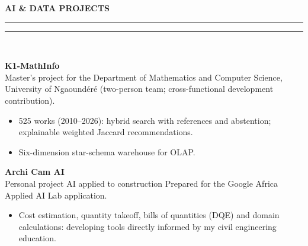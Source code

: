\documentclass[10pt,a4paper]{article}
\newcommand{\mainSecTitle}[1]{%
  \vspace{11pt}%
  {\fontsize{11.0}{13.0}\selectfont\textbf{\color{sectionNavy}\MakeUppercase{#1}}}\\[2.5pt]%
  {\color{accentTeal}\rule{19mm}{1.2pt}\color{subtleRule}\rule{\dimexpr\linewidth-19mm\relax}{0.6pt}}\\[6pt]%
}
\begin{document}
\begin{minipage}[t]{0.648\textwidth}
  \vspace{3pt}
  \mainSecTitle{AI \& Data projects}
  \begin{tcolorbox}[enhanced, frame hidden, interior hidden,
    borderline west={1.8pt}{0pt}{accentTeal},
    left=8pt, right=0pt, top=1.5pt, bottom=1.5pt, boxsep=0pt]
    \raggedright
    {\fontsize{11.2}{13.4}\selectfont\textbf{\color{primaryDark}K1-MathInfo}}\\[2pt]
    {\fontsize{9.1}{12.1}\selectfont\color{mutedSlate}Master’s project for the Department of Mathematics and Computer Science, University of Ngaoundéré (two-person team; cross-functional development contribution).}\\[3pt]
    \begin{itemize}[leftmargin=10pt,label={\color{accentTeal}\tiny$\blacksquare$},itemsep=3.2pt,topsep=1.5pt,parsep=0pt]
    \item {\fontsize{9.9}{13.5}\selectfont\color{bodyText}525 works (2010--2026): hybrid search with references and abstention; explainable weighted Jaccard recommendations.}
    \item {\fontsize{9.9}{13.5}\selectfont\color{bodyText}Six-dimension star-schema warehouse for OLAP.}
    \end{itemize}
  \end{tcolorbox}
\vspace{10pt}
  \begin{tcolorbox}[enhanced, frame hidden, interior hidden,
    borderline west={1.0pt}{0pt}{subtleRule},
    left=8pt, right=0pt, top=1.5pt, bottom=1.5pt, boxsep=0pt]
    \raggedright
    {\fontsize{11.2}{13.4}\selectfont\textbf{\color{primaryDark}Archi Cam AI}}\\[2pt]
    {\fontsize{9.1}{12.1}\selectfont\color{mutedSlate}Personal project \textperiodcentered{} AI applied to construction \textperiodcentered{} Prepared for the Google Africa Applied AI Lab application.}\\[3pt]
    \begin{itemize}[leftmargin=10pt,label={\color{accentTeal}\tiny$\blacksquare$},itemsep=3.2pt,topsep=1.5pt,parsep=0pt]
    \item {\fontsize{9.9}{13.5}\selectfont\color{bodyText}Cost estimation, quantity takeoff, bills of quantities (DQE) and domain calculations: developing tools directly informed by my civil engineering education.}
    \end{itemize}
  \end{tcolorbox}
\vspace{10pt}
  \begin{tcolorbox}[enhanced, frame hidden, interior hidden,
    borderline west={1.0pt}{0pt}{subtleRule},
    left=8pt, right=0pt, top=1.5pt, bottom=1.5pt, boxsep=0pt]

\end{tcolorbox}
\end{minipage}
\end{document}
